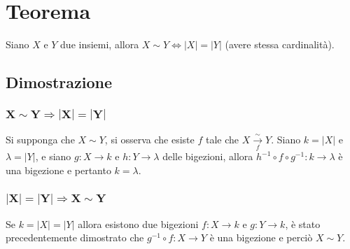 \section{Teorema}
Siano $X$ e $Y$ due insiemi, allora $X\sim Y\Leftrightarrow|X|=|Y|$ (avere stessa cardinalit\`a).
\subsection{Dimostrazione}
\subsubsection{$\mathbf{X\sim Y\Rightarrow |X|=|Y|}$}
Si supponga che $X\sim Y$, si osserva che esiste $f$ tale che $X\xrightarrow[f]{\sim}Y$. Siano $k=|X|$ e $\lambda=|Y|$, e siano $g:X\rightarrow k$ e $h:Y\rightarrow\lambda$ delle 
bigezioni, allora $h^{-1}\circ f\circ g^{-1}:k\rightarrow\lambda$ \`e una bigezione e pertanto $k=\lambda$.
\subsubsection{$\mathbf{|X|=|Y|\Rightarrow X\sim Y}$}
Se $k=|X|=|Y|$ allora esistono due bigezioni $f:X\rightarrow k$ e $g:Y\rightarrow k$, \`e stato precedentemente dimostrato che $g^{-1}\circ f:X\rightarrow Y$ \`e una bigezione e 
perci\`o $X\sim Y$.
